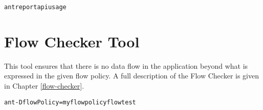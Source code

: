 \begin{alltt}
ant reportapiusage
\end{alltt}

\section{Flow Checker Tool\label{sec:checkertool}}

This tool ensures that there is no data flow in the application beyond what is expressed in the given flow policy.  A full description of the Flow Checker is given in Chapter \ref{flow-checker}. 

\begin{alltt}
ant -DflowPolicy=myflowpolicy flowtest
\end{alltt}

